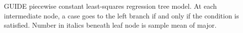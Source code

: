 \documentclass[12pt]{article}
\begin{document}
 \begin{center}
 \end{center}
GUIDE piecewise constant least-squares regression tree model.
At each intermediate node, a case goes to the left branch 
  if and only if the condition is satisfied.
Number in italics beneath leaf node is sample mean of major.
 
\end{document}
